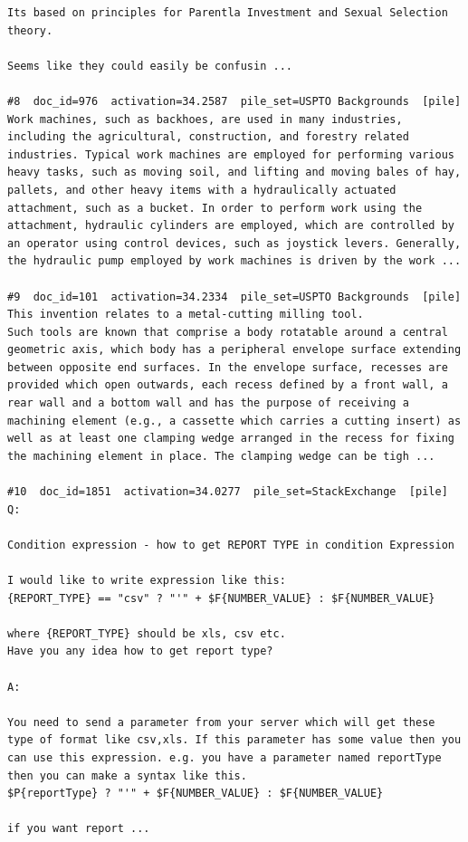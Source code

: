 \begin{verbatim}
Its based on principles for Parentla Investment and Sexual Selection theory.

Seems like they could easily be confusin ...

#8  doc_id=976  activation=34.2587  pile_set=USPTO Backgrounds  [pile]
Work machines, such as backhoes, are used in many industries, including the agricultural, construction, and forestry related industries. Typical work machines are employed for performing various heavy tasks, such as moving soil, and lifting and moving bales of hay, pallets, and other heavy items with a hydraulically actuated attachment, such as a bucket. In order to perform work using the attachment, hydraulic cylinders are employed, which are controlled by an operator using control devices, such as joystick levers. Generally, the hydraulic pump employed by work machines is driven by the work ...

#9  doc_id=101  activation=34.2334  pile_set=USPTO Backgrounds  [pile]
This invention relates to a metal-cutting milling tool.
Such tools are known that comprise a body rotatable around a central geometric axis, which body has a peripheral envelope surface extending between opposite end surfaces. In the envelope surface, recesses are provided which open outwards, each recess defined by a front wall, a rear wall and a bottom wall and has the purpose of receiving a machining element (e.g., a cassette which carries a cutting insert) as well as at least one clamping wedge arranged in the recess for fixing the machining element in place. The clamping wedge can be tigh ...

#10  doc_id=1851  activation=34.0277  pile_set=StackExchange  [pile]
Q:

Condition expression - how to get REPORT TYPE in condition Expression

I would like to write expression like this:
{REPORT_TYPE} == "csv" ? "'" + $F{NUMBER_VALUE} : $F{NUMBER_VALUE}

where {REPORT_TYPE} should be xls, csv etc.
Have you any idea how to get report type?

A:

You need to send a parameter from your server which will get these type of format like csv,xls. If this parameter has some value then you can use this expression. e.g. you have a parameter named reportType then you can make a syntax like this.
$P{reportType} ? "'" + $F{NUMBER_VALUE} : $F{NUMBER_VALUE}

if you want report ...

\end{verbatim}


